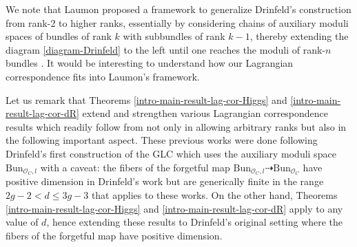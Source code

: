 \documentclass[twoside, 11pt]{article}
\numberwithin{equation}{section}
\theoremstyle{theorem}
\numberwithin{theorem}{section}
\theoremstyle{definition}
\begin{document}
We note that Laumon proposed a framework to generalize Drinfeld's construction from rank-2 to higher ranks, essentially by considering chains of auxiliary moduli spaces of bundles of rank $k$ with subbundles of rank $k-1$, thereby extending the diagram \eqref{diagram-Drinfeld} to the left until one reaches the moduli of rank-$n$ bundles \cite{Laumon95}.  It would be interesting to understand how our Lagrangian correspondence fits into Laumon's framework.

Let us remark that Theorems \ref{intro-main-result-lag-cor-Higgs} and \ref{intro-main-result-lag-cor-dR} 
extend and strengthen various Lagrangian correspondence results
which readily follow from \cite{iwasaki92, pinchbeck, DT23, D24-lambda} 
not only in allowing arbitrary ranks
but also in the following important aspect.
These previous works were done following Drinfeld's first construction of the GLC which uses the auxiliary moduli space $\mathrm{Bun}_{\mathcal{O}_C, l}$ with a caveat: 
the fibers of the forgetful map $\mathrm{Bun}_{\mathcal{O}_C, l} \dashrightarrow \mathrm{Bun}_{\mathcal{O}_C}$ have positive dimension in Drinfeld's work but are generically finite in the range $2g-2 < d \leq 3g-3$ that applies to these works.
On the other hand, Theorems \ref{intro-main-result-lag-cor-Higgs} and \ref{intro-main-result-lag-cor-dR} apply to any value of $d$, hence extending these results to Drinfeld's original setting where the fibers of the forgetful map have positive dimension.
\end{document}
